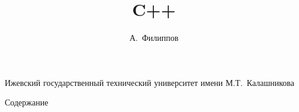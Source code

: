 \title[C++]{C++}
\author[Филиппов]{А.~Филиппов}
\institute
{
    Ижевский государственный технический университет имени М.Т.~Калашникова
}
\frame{\titlepage}
\begin{frame}[allowframebreaks]{Содержание}
    \tableofcontents
\end{frame}
